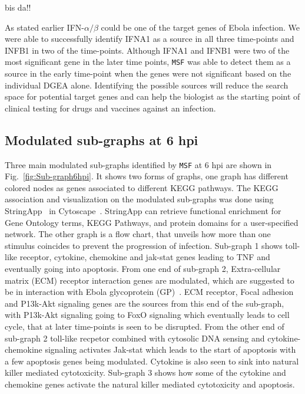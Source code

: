 \documentclass[10pt,a4paper,twocolumn]{article}
\newcommand{\TODO}[1]{\begingroup\color{red}#1\endgroup}
\begin{document}
\TODO{bis da!!}

As stated earlier IFN-$\alpha / \beta$ could be one of the target
genes of Ebola infection. We were able to successfully identify IFNA1
as a source in all three time-points and INFB1 in two of the
time-points. Although IFNA1 and IFNB1 were two of the most significant
gene in the later time points, \texttt{MSF} was able to detect them as
a source in the early time-point when the genes were not significant
based on the individual DGEA alone. Identifying the possible sources will
reduce the search space for potential target genes and can help the
biologist as the starting point of clinical testing for drugs and
vaccines against an infection.



\subsection*{Modulated sub-graphs at 6 hpi}

 Three main modulated sub-graphs identified by \texttt{MSF} at 6 hpi
 are shown in Fig.~\ref{fig:Sub-graph6hpi}. It shows two forms of graphs, one graph has different colored nodes as
 genes associated to different KEGG pathways. The KEGG
 association and visualization on the modulated sub-graphs was done
 using StringApp~\cite{StringApp} in Cytoscape~\cite{Cyto}. StringApp can retrieve functional enrichment for Gene Ontology terms, KEGG Pathways, and protein domains for a user-specified network. The other graph is a flow chart, that
 unveils how more than one stimulus coincides to prevent the
 progression of infection. Sub-graph 1 shows toll-like receptor,
 cytokine, chemokine and jak-stat genes leading to TNF and eventually
 going into apoptosis. From one end  of sub-graph 2, Extra-cellular matrix (ECM)
 receptor interaction genes are modulated, which are suggested to be in interaction
 with Ebola glycoprotein (GP)~\cite{Veljkovic}. ECM receptor, Focal
 adhesion and P13k-Akt signaling genes are the sources from this end of
 the sub-graph, with P13k-Akt signaling going to FoxO signaling which
 eventually leads to cell cycle, that at later time-points is
 seen to be disrupted. From the other end of sub-graph 2 toll-like recpetor
 combined with cytosolic DNA sensing and cytokine-chemokine signaling
 activates Jak-stat which leads to the start of apoptosis with a
 few apoptosis genes being modulated. Cytokine is also seen to sink
 into natural killer mediated cytotoxicity. Sub-graph 3 shows how some
 of the cytokine and chemokine genes activate the natural killer
 mediated cytotoxicity and apoptosis.
 
\end{document}
